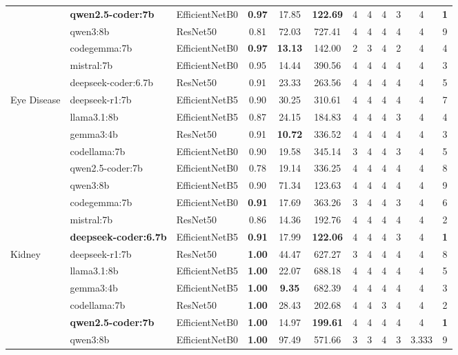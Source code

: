 \documentclass{article}
\begin{document}
\begin{small}
\begin{tabularx}{\textwidth}{l l l c c c c c c c c c}
 & \textbf{qwen2.5-coder:7b} & EfficientNetB0 & \textbf{0.97} & 17.85 & \textbf{122.69} & 4 & 4 & 4 & 3 & 4 & \textbf{1} \\
 & qwen3:8b & ResNet50 & 0.81 & 72.03 & 727.41 & 4 & 4 & 4 & 4 & 4 & 9 \\
 & codegemma:7b & EfficientNetB0 & \textbf{0.97} & \textbf{13.13} & 142.00 & 2 & 3 & 4 & 2 & 4 & 4 \\
 & mistral:7b & EfficientNetB0 & 0.95 & 14.44 & 390.56 & 4 & 4 & 4 & 4 & 4 & 3 \\
 & deepseek-coder:6.7b & ResNet50 & 0.91 & 23.33 & 263.56 & 4 & 4 & 4 & 4 & 4 & 5 \\
\midrule
\multirow{9}{*}{Eye Disease}
 & deepseek-r1:7b & EfficientNetB5 & 0.90 & 30.25 & 310.61 & 4 & 4 & 4 & 4 & 4 & 7 \\
 & llama3.1:8b & EfficientNetB5 & 0.87 & 24.15 & 184.83 & 4 & 4 & 4 & 3 & 4 & 4 \\
 & gemma3:4b & ResNet50 & 0.91 & \textbf{10.72} & 336.52 & 4 & 4 & 4 & 4 & 4 & 3 \\
 & codellama:7b & EfficientNetB0 & 0.90 & 19.58 & 345.14 & 3 & 4 & 4 & 3 & 4 & 5 \\
 & qwen2.5-coder:7b & EfficientNetB0 & 0.78 & 19.14 & 336.25 & 4 & 4 & 4 & 4 & 4 & 8 \\
 & qwen3:8b & EfficientNetB5 & 0.90 & 71.34 & 123.63 & 4 & 4 & 4 & 4 & 4 & 9 \\
 & codegemma:7b & EfficientNetB0 & \textbf{0.91} & 17.69 & 363.26 & 3 & 4 & 4 & 3 & 4 & 6 \\
 & mistral:7b & ResNet50 & 0.86 & 14.36 & 192.76 & 4 & 4 & 4 & 4 & 4 & 2 \\
 & \textbf{deepseek-coder:6.7b} & EfficientNetB5 & \textbf{0.91} & 17.99 & \textbf{122.06} & 4 & 4 & 4 & 3 & 4 & \textbf{1} \\
\midrule
\multirow{9}{*}{Kidney}
 & deepseek-r1:7b & ResNet50 & \textbf{1.00} & 44.47 & 627.27 & 3 & 4 & 4 & 4 & 4 & 8 \\
 & llama3.1:8b & EfficientNetB5 & \textbf{1.00} & 22.07 & 688.18 & 4 & 4 & 4 & 4 & 4 & 5 \\
 & gemma3:4b & EfficientNetB5 & \textbf{1.00} & \textbf{9.35} & 682.39 & 4 & 4 & 4 & 4 & 4 & 3 \\
 & codellama:7b & ResNet50 & \textbf{1.00} & 28.43 & 202.68 & 4 & 4 & 3 & 4 & 4 & 2 \\
 & \textbf{qwen2.5-coder:7b} & EfficientNetB0 & \textbf{1.00} & 14.97 & \textbf{199.61} & 4 & 4 & 4 & 4 & 4 & \textbf{1} \\
 & qwen3:8b & EfficientNetB0 & \textbf{1.00} & 97.49 & 571.66 & 3 & 3 & 4 & 3 & 3.333 & 9 \\

\end{tabularx}
\end{small}
\end{document}
